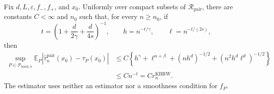 Fix \(d,L,\varepsilon,f_-,f_+\), and \(x_0\).  Uniformly over compact
subsets of \(\mathcal R_{\mathrm{pair}}\), there are constants \(C<\infty\)
and \(n_0\) such that, for every \(n\geq n_0\), if
\[
t=\left(1+\frac d{2\gamma}+\frac d{4s}\right)^{-1},
\qquad h=n^{-t/\gamma},\qquad \ell=n^{-t/(2s)},
\]
then
\[
\begin{aligned}
\sup_{P\in\mathcal P_{\mathrm{band},n}}
\mathbb E_P\left|
\widehat\tau_n^{\mathrm{pair}}(x_0)-\tau_P(x_0)
\right|
&\leq C\left\{
h^\gamma+\ell^{\alpha+\beta}
+(nh^d)^{-1/2}+(n^2h^d\ell^d)^{-1/2}
\right\}\\
&\leq C n^{-t}=C r_n^{\mathrm{KBRW}}.
\end{aligned}
\]
The estimator uses neither an estimator nor a smoothness condition for
\(f_P\).
